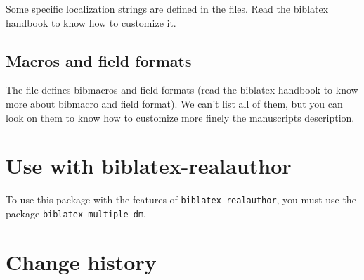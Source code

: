 \documentclass{ltxdockit}[2011/03/25]
\newcommand{\biblatex}{biblatex\xspace}
\begin{document}
Some specific localization strings are defined in the  files. Read the \biblatex handbook to know how to customize it.

\subsection{Macros and field formats}

The  file defines bibmacros and field formats (read the \biblatex handbook to know more about bibmacro and field format). We can't list all of them, but you can look on them to know how to customize more finely the manuscripts description.

\section{Use with biblatex-realauthor}\label{biblatex-multiple-dm}

To use this package with the features of \verb+biblatex-realauthor+, you must use the package \verb+biblatex-multiple-dm+.


\section{Change history}
\end{document}
